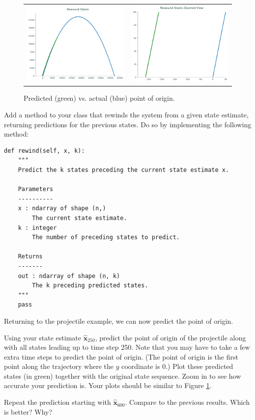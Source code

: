 \begin{figure}[htb]
    \centering
    \begin{tabular}{cc}
    \includegraphics[width=.45\textwidth]{figures/origin_macro} &
    \includegraphics[width=.45\textwidth]{figures/origin_micro}
    \end{tabular}
    \caption{Predicted (green) vs. actual (blue) point of origin.}
    \label{fig:origin}
\end{figure}

\begin{problem}
Add a method to your class that rewinds the system from a given state estimate, returning predictions for the previous states.
Do so by implementing the following method:
\begin{lstlisting}
def rewind(self, x, k):
    """
    Predict the k states preceding the current state estimate x.

    Parameters
    ----------
    x : ndarray of shape (n,)
        The current state estimate.
    k : integer
        The number of preceding states to predict.

    Returns
    -------
    out : ndarray of shape (n, k)
        The k preceding predicted states.
    """
    pass
\end{lstlisting}
\end{problem}

Returning to the projectile example, we can now predict the point of origin.

\begin{problem}
Using your state estimate $\widehat{\mathbf{x}}_{250}$, predict the point of origin of the projectile along with
all states leading up to time step 250. Note that you may have to take a few extra time steps to predict the point of origin.
(The point of origin is the first point along the trajectory where the $y$ coordinate is 0.)
Plot these predicted states (in green) together with the original state sequence.
Zoom in to see how accurate your prediction is.
Your plots should be similar to Figure \ref{fig:origin}.
\label{prob:origin_pt}

Repeat the prediction starting with $\widehat{\mathbf{x}}_{600}$.
Compare to the previous results.
Which is better?
Why?
\end{problem}
